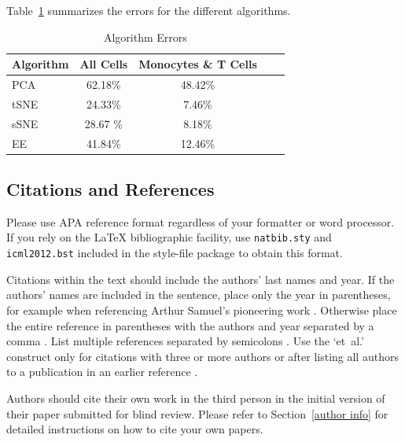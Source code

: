 \documentclass{article}
\begin{document}
Table~\ref{tableErrors} summarizes the errors for the different algorithms.

\begin{table}[tb]
\caption{Algorithm Errors}
\label{tableErrors}
\vskip 0.15in
\begin{center}
\begin{small}
\begin{sc}
\begin{tabular}{lcccr}
\hline
\abovespace\belowspace
Algorithm & All Cells & Monocytes \& T Cells \\
\hline
\abovespace
PCA	& 62.18\% & 48.42\%  \\
tSNE 	& 24.33\%  & 7.46\%\\ 
sSNE	& 28.67 \%  & 8.18\%\\
\belowspace
EE		& 41.84\% &12.46\% \\
\hline
\end{tabular}
\end{sc}
\end{small}
\end{center}
\vskip -0.1in
\end{table}

 
\subsection{Citations and References} 

Please use APA reference format regardless of your formatter
or word processor. If you rely on the \LaTeX\/ bibliographic 
facility, use {\tt natbib.sty} and {\tt icml2012.bst} 
included in the style-file package to obtain this format.

Citations within the text should include the authors' last names and
year. If the authors' names are included in the sentence, place only
the year in parentheses, for example when referencing Arthur Samuel's
pioneering work . Otherwise place the entire
reference in parentheses with the authors and year separated by a
comma \cite{Bendall:2011bm}. List multiple references separated by
semicolons \cite{Bendall:2011bm, Crammer:2002uy, Bendall:2011bm}. Use the `et~al.'
construct only for citations with three or more authors or after
listing all authors to a publication in an earlier reference \cite{Bendall:2011bm}.

Authors should cite their own work in the third person
in the initial version of their paper submitted for blind review.
Please refer to Section~\ref{author info} for detailed instructions on how to
cite your own papers.
\end{document}
